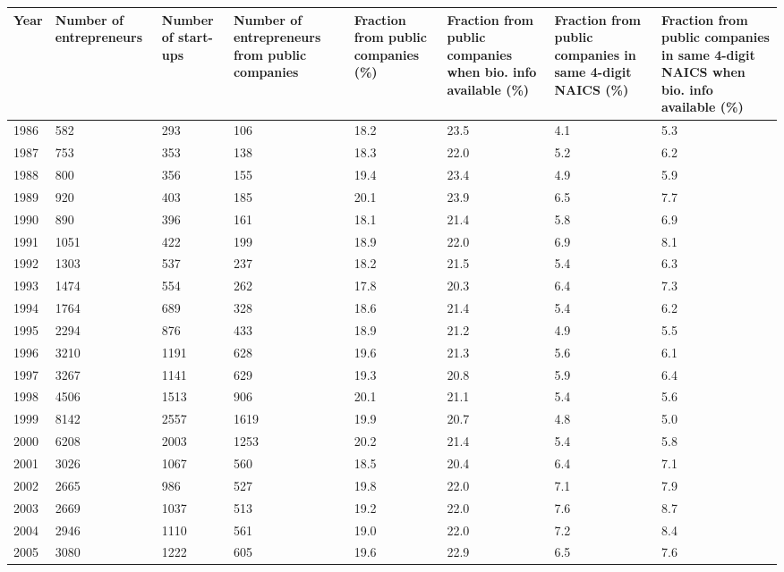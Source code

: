 \begin{table}[ht]
\centering
\begingroup\footnotesize
\begin{tabular}{p{1.75cm}p{1.75cm}p{1.75cm}p{1.75cm}p{1.75cm}p{1.75cm}p{1.75cm}p{1.75cm}}
  \toprule
Year & Number of entrepreneurs & Number of start-ups & Number of entrepreneurs from public companies & Fraction from public companies (\%) & Fraction from public companies when bio. info available (\%) & Fraction from public companies in same 4-digit NAICS (\%) & Fraction from public companies in same 4-digit NAICS when bio. info available (\%) \\ 
  \midrule
1986 & 582 & 293 & 106 & 18.2 & 23.5 & 4.1 & 5.3 \\ 
  1987 & 753 & 353 & 138 & 18.3 & 22.0 & 5.2 & 6.2 \\ 
  1988 & 800 & 356 & 155 & 19.4 & 23.4 & 4.9 & 5.9 \\ 
  1989 & 920 & 403 & 185 & 20.1 & 23.9 & 6.5 & 7.7 \\ 
  1990 & 890 & 396 & 161 & 18.1 & 21.4 & 5.8 & 6.9 \\ 
  1991 & 1051 & 422 & 199 & 18.9 & 22.0 & 6.9 & 8.1 \\ 
  1992 & 1303 & 537 & 237 & 18.2 & 21.5 & 5.4 & 6.3 \\ 
  1993 & 1474 & 554 & 262 & 17.8 & 20.3 & 6.4 & 7.3 \\ 
  1994 & 1764 & 689 & 328 & 18.6 & 21.4 & 5.4 & 6.2 \\ 
  1995 & 2294 & 876 & 433 & 18.9 & 21.2 & 4.9 & 5.5 \\ 
  1996 & 3210 & 1191 & 628 & 19.6 & 21.3 & 5.6 & 6.1 \\ 
  1997 & 3267 & 1141 & 629 & 19.3 & 20.8 & 5.9 & 6.4 \\ 
  1998 & 4506 & 1513 & 906 & 20.1 & 21.1 & 5.4 & 5.6 \\ 
  1999 & 8142 & 2557 & 1619 & 19.9 & 20.7 & 4.8 & 5.0 \\ 
  2000 & 6208 & 2003 & 1253 & 20.2 & 21.4 & 5.4 & 5.8 \\ 
  2001 & 3026 & 1067 & 560 & 18.5 & 20.4 & 6.4 & 7.1 \\ 
  2002 & 2665 & 986 & 527 & 19.8 & 22.0 & 7.1 & 7.9 \\ 
  2003 & 2669 & 1037 & 513 & 19.2 & 22.0 & 7.6 & 8.7 \\ 
  2004 & 2946 & 1110 & 561 & 19.0 & 22.0 & 7.2 & 8.4 \\ 
  2005 & 3080 & 1222 & 605 & 19.6 & 22.9 & 6.5 & 7.6 \\ 

\end{tabular}
\end{table}
